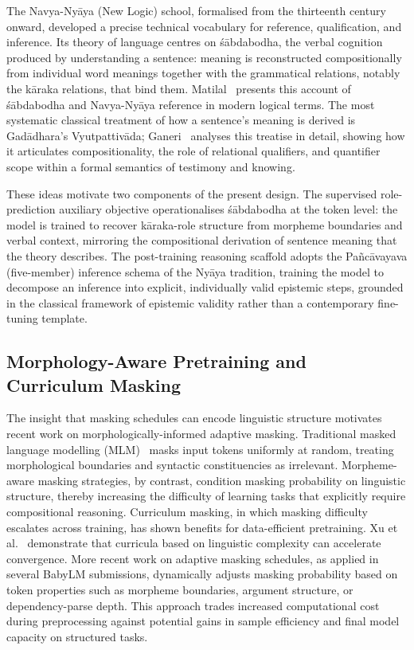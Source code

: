 The Navya-Nyāya (New Logic) school, formalised from the thirteenth century onward, developed a precise technical vocabulary for reference, qualification, and inference. Its theory of language centres on śābdabodha, the verbal cognition produced by understanding a sentence: meaning is reconstructed compositionally from individual word meanings together with the grammatical relations, notably the kāraka relations, that bind them. Matilal~\cite{Matilal1990WordWorld} presents this account of śābdabodha and Navya-Nyāya reference in modern logical terms. The most systematic classical treatment of how a sentence's meaning is derived is Gadādhara's Vyutpattivāda; Ganeri~\cite{Ganeri1999SemanticPowers} analyses this treatise in detail, showing how it articulates compositionality, the role of relational qualifiers, and quantifier scope within a formal semantics of testimony and knowing.

These ideas motivate two components of the present design. The supervised role-prediction auxiliary objective operationalises śābdabodha at the token level: the model is trained to recover kāraka-role structure from morpheme boundaries and verbal context, mirroring the compositional derivation of sentence meaning that the theory describes. The post-training reasoning scaffold adopts the Pañcāvayava (five-member) inference schema of the Nyāya tradition, training the model to decompose an inference into explicit, individually valid epistemic steps, grounded in the classical framework of epistemic validity rather than a contemporary fine-tuning template.

\subsection{Morphology-Aware Pretraining and Curriculum Masking}

The insight that masking schedules can encode linguistic structure motivates recent work on morphologically-informed adaptive masking. Traditional masked language modelling (MLM)~\cite{Devlin2019} masks input tokens uniformly at random, treating morphological boundaries and syntactic constituencies as irrelevant. Morpheme-aware masking strategies, by contrast, condition masking probability on linguistic structure, thereby increasing the difficulty of learning tasks that explicitly require compositional reasoning. Curriculum masking, in which masking difficulty escalates across training, has shown benefits for data-efficient pretraining. Xu et al.~\cite{Xu2020Curriculum} demonstrate that curricula based on linguistic complexity can accelerate convergence. More recent work on adaptive masking schedules, as applied in several BabyLM submissions, dynamically adjusts masking probability based on token properties such as morpheme boundaries, argument structure, or dependency-parse depth. This approach trades increased computational cost during preprocessing against potential gains in sample efficiency and final model capacity on structured tasks.

